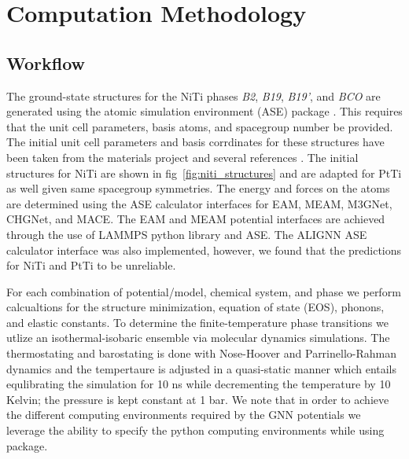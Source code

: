 \documentclass[preprint]{elsarticle}
\begin{document}
\section{Computation Methodology}
\label{sec:methods}

\subsection{Workflow}
\label{sec:workflow}
The ground-state structures for the NiTi phases \textit{B2}, \textit{B19}, \textit{B19'}, and \textit{BCO} are generated using the atomic simulation environment (ASE) package \cite{Larsen2017}. This requires that the unit cell parameters, basis atoms, and spacegroup number be provided. The initial unit cell parameters and basis corrdinates for these structures have been taken from the materials project\cite{Jain2013} and several references \cite{Haskins2016,Kadkhodaei2018}. The initial structures for NiTi are shown in fig~\ref{fig:niti_structures} and are adapted for PtTi as well given same spacegroup symmetries. The energy and forces on the atoms are determined using the ASE calculator interfaces for EAM, MEAM, M3GNet, CHGNet, and MACE.\cite{Mutter2010,Zhong2011,Ko2015,Kim2017,Chen2022,Deng2023,Batatia2022} The EAM and MEAM potential interfaces are achieved through the use of LAMMPS python library\cite{Thompson2022} and ASE. The ALIGNN ASE calculator interface was also implemented, however, we found that the predictions for NiTi and PtTi to be unreliable.\par

For each combination of potential/model, chemical system, and phase we perform calcualtions for the structure minimization, equation of state (EOS), phonons, and elastic constants. To determine the finite-temperature phase transitions we utlize an isothermal-isobaric ensemble via molecular dynamics simulations. The thermostating and barostating is done with Nose-Hoover and Parrinello-Rahman dynamics and the tempertaure is adjusted in a quasi-static manner which entails equlibrating the simulation for 10 ns while decrementing the temperature by 10 Kelvin; the pressure is kept constant at 1 bar. We note that in order to achieve the different computing environments required by the GNN potentials we leverage the ability to specify the  python computing environments while using \href{https://github.com/showyourwork/showyourwork}{\showyourwork} package.\par
\end{document}
